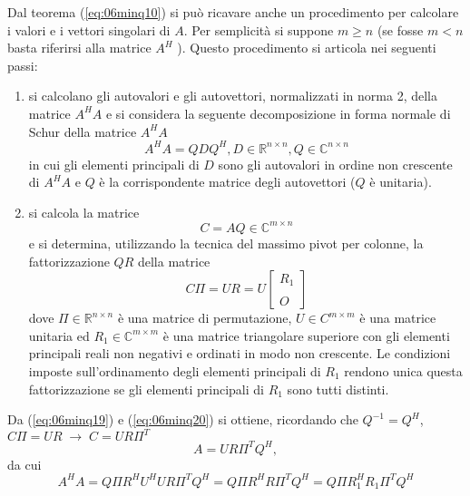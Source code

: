 Dal teorema (\ref{eq:06minq10}) 
si pu\`o ricavare anche un procedimento per calcolare
i valori e i vettori singolari di $A$. Per semplicit\`a si suppone
 $m \geq  n$ (se fosse  $m < n$ basta riferirsi alla matrice
 $A^H$ ). Questo procedimento si articola nei seguenti passi:
 \begin{enumerate}
 \item   si calcolano gli autovalori e gli autovettori,
 normalizzati in norma 2, della matrice $A^H A$ e si considera la
 seguente decomposizione in forma normale di Schur della matrice
$ A^H A$
\begin{equation}
  \label{eq:06minq18}
A^H A = QDQ^H , D \in \mathbb{R}^{n\times n} , Q \in 
\mathbb{C}^{n \times n}   
\end{equation}
in cui gli elementi principali di $D$ sono gli autovalori in 
ordine non crescente di $A^H A$ e $Q$ \`e la corrispondente 
matrice degli autovettori ($Q$ \`e unitaria).

\item
 si calcola la matrice
 \begin{equation}
   \label{eq:06minq19}
  C = AQ \in \mathbb{C}^{m \times n} 
 \end{equation}
e si determina, utilizzando la tecnica del massimo pivot 
per colonne, la fattorizzazione $QR$ della matrice
\begin{equation}
  \label{eq:06minq20}
  C\Pi  = UR = U 
\left[
\begin{array}{c}
R_1  \\
     \\
O
\end{array}
\right]
\end{equation}
dove $\Pi \in \mathbb{R}^{n \times n}$ \`e una matrice di
permutazione, $U \in C^{m \times m}$ \`e una matrice unitaria ed $R_1
\in \mathbb{C}^{m \times m}$ \`e una matrice triangolare superiore con
gli elementi principali reali non negativi e ordinati in modo non
crescente. Le condizioni imposte sull'ordinamento degli elementi
principali di $R_1$ rendono unica questa fattorizzazione se gli
elementi principali di $R_1$ sono tutti distinti.

 \end{enumerate}
Da (\ref{eq:06minq19}) e 
(\ref{eq:06minq20}) si ottiene,
ricordando che $Q^{-1} = Q^{H}$, $C\Pi = UR \;\rightarrow \; C = UR\Pi^{T}$
\begin{equation}
  \label{eq:06minq21}
A = U R\Pi^T Q^H ,
\end{equation}
da cui
$$A^H A = Q\Pi R^H U^H U R\Pi^T Q^H = Q\Pi R^H R\Pi^T Q^H =
 Q\Pi R_1^{H} R_1 \Pi^{T}Q^{H}$$

